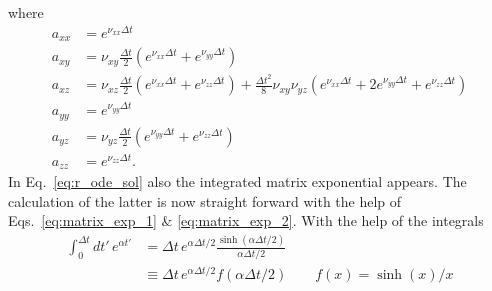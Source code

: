 \documentclass[12pt,letter]{article}
\begin{document}
where
\begin{equation}
\begin{aligned}
a_{xx} &= e^{\nu_{xx} \Delta t}\\
a_{xy} &= \nu_{xy} \frac{\Delta t}2 (e^{\nu_{xx} \Delta t} + e^{\nu_{yy} \Delta t})\\
a_{xz} &= \nu_{xz} \frac{\Delta t}2 (e^{\nu_{xx} \Delta t} + e^{\nu_{zz} \Delta t})
+ \frac{\Delta t^2}{8} \nu_{xy}\nu_{yz} (e^{\nu_{xx} \Delta t} +2 e^{\nu_{yy} \Delta t}+ e^{\nu_{zz} \Delta t} )\\
a_{yy} &= e^{\nu_{yy} \Delta t}\\
a_{yz} &= \nu_{yz} \frac{\Delta t}2 (e^{\nu_{yy} \Delta t} + e^{\nu_{zz} \Delta t})\\
a_{zz} &= e^{\nu_{zz} \Delta t}. \end{aligned}\label{eq:matrix_exp_2}
\end{equation}
In Eq.~\eqref{eq:r_ode_sol} also the integrated matrix exponential appears. The calculation
of the latter is now straight forward with the help of Eqs.~\eqref{eq:matrix_exp_1} \& \eqref{eq:matrix_exp_2}. With the help of the integrals
\begin{equation}\begin{aligned}
\int_0^{\Delta t} d t'\, e^{\alpha t'} &= \Delta t\, e^{\alpha \Delta t/2} \frac{\sinh(\alpha \Delta t/2)}{\alpha
\Delta t/2}\\
&\equiv \Delta t\, e^{\alpha \Delta t/2} f(\alpha \Delta t/2)\qquad f(x)=\sinh(x)/x
\end{aligned}
\end{equation}
\end{document}

